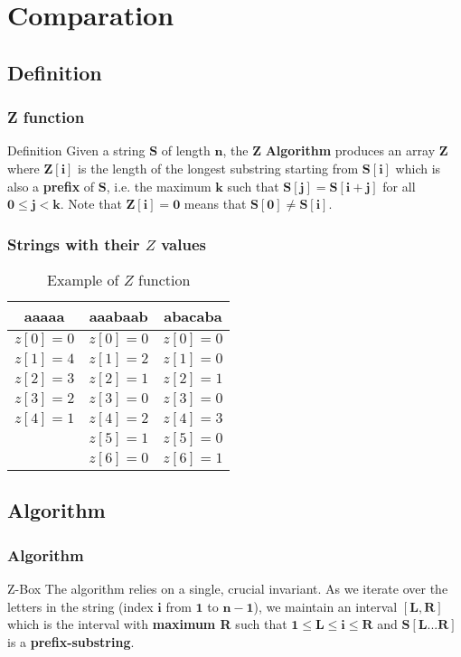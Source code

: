 \documentclass{beamer}
\begin{document}
\section{Comparation}
\subsection{Definition}
\begin{frame}
\frametitle{Z function}
\begin{block}{Definition}
Given a string $\mathbf{S}$ of length $\mathbf{n}$, the $\mathbf{Z}$ \textbf{Algorithm} produces an array $\mathbf{Z}$ where $\mathbf{Z[i]}$ is the length of the longest substring starting from $\mathbf{S[i]}$ which is also a \textbf{prefix} of $\mathbf{S}$, i.e. the maximum $\mathbf{k}$ such that $\mathbf{S[j] = S[i + j]}$ for all $\mathbf{0 \le j < k}$. Note that $\mathbf{Z[i] = 0}$ means that $\mathbf{S[0] \ne S[i]}$. 
\end{block}
\end{frame}
\begin{frame}
\frametitle{Strings with their $Z$ values}
\begin{table}
\begin{tabular}{|c|c|c|}
\toprule
\textbf{aaaaa} & \textbf{aaabaab} & \textbf{abacaba}\\
\midrule
$z[0]=0$ & $z[0]=0$ & $z[0]=0$ \\
$z[1]=4$ & $z[1]=2$ & $z[1]=0$ \\
$z[2]=3$ & $z[2]=1$ & $z[2]=1$ \\
$z[3]=2$ & $z[3]=0$ & $z[3]=0$ \\
$z[4]=1$ & $z[4]=2$ & $z[4]=3$ \\
         & $z[5]=1$ & $z[5]=0$ \\
         & $z[6]=0$ & $z[6]=1$ \\

\bottomrule
\end{tabular}
\caption{Example of $Z$ function}
\end{table}
\end{frame}

\subsection{Algorithm}

\begin{frame}
\frametitle{Algorithm}
\begin{block}{Z-Box}
The algorithm relies on a single, crucial invariant. As we iterate over the letters in the string (index $\mathbf{i}$ from $\mathbf{1}$ to $\mathbf{n-1}$), we maintain an interval $\mathbf{[L, R]}$ which is the interval with \textbf{maximum R} such that $\mathbf{1 \le L \le i \le R}$ and $\mathbf{S[L...R]}$ is a \textbf{prefix-substring}.
\end{block} 
\end{frame}
\end{document}
